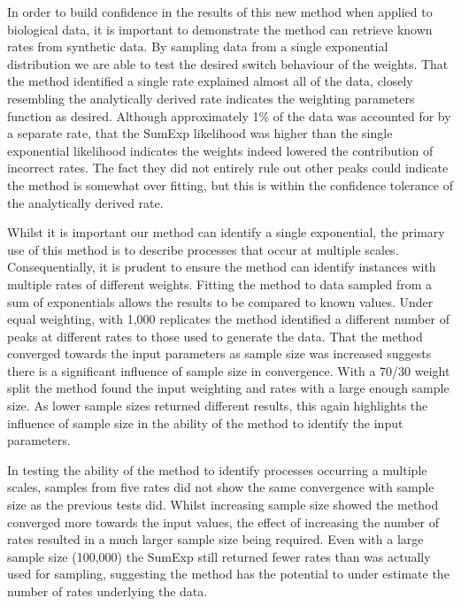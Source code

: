 \documentclass[11pt,usenames,dvipsnames]{article}
\begin{document}
\begin{linenumbers}
\hspace{\parindent}
In order to build confidence in the results of this new method when applied to biological data, it is important to demonstrate the method can retrieve known rates from synthetic data. By sampling data from a single exponential distribution we are able to test the desired switch behaviour of the weights. That the method identified a single rate explained almost all of the data, closely resembling the analytically derived rate indicates the weighting parameters function as desired. Although approximately 1\% of the data was accounted for by a separate rate, that the SumExp likelihood was higher than the single exponential likelihood indicates the weights indeed lowered the contribution of incorrect rates. The fact they did not entirely rule out other peaks could indicate the method is somewhat over fitting, but this is within the confidence tolerance of the analytically derived rate.

Whilst it is important our method can identify a single exponential, the primary use of this method is to describe processes that occur at multiple scales. Consequentially, it is prudent to ensure the method can identify instances with multiple rates of different weights. Fitting the method to data sampled from a sum of exponentials allows the results to be compared to known values. Under equal weighting, with 1,000 replicates the method identified a different number of peaks at different rates to those used to generate the data. That the method converged towards the input parameters as sample size was increased suggests there is a significant influence of sample size in convergence. With a 70/30 weight split the method found the input weighting and rates with a large enough sample size. As lower sample sizes returned different results, this again highlights the influence of sample size in the ability of the method to identify the input parameters.

In testing the ability of the method to identify processes occurring a multiple scales, samples from five rates did not show the same convergence with sample size as the previous tests did. Whilst increasing sample size showed the method converged more towards the input values, the effect of increasing the number of rates resulted in a much larger sample size being required. Even with a large sample size (100,000) the SumExp still returned fewer rates than was actually used for sampling, suggesting the method has the potential to under estimate the number of rates underlying the data. 


\end{linenumbers}
\end{document}
